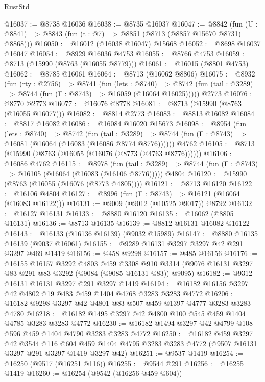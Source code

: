 \begin{lexlean}{RustStd}
\begin{coremodule}
@16037 := @8738 @16036
@16038 := @8735 @16037
@16047 := @8842
    (fun (U : @8841) => @8843 (fun (t : @7) => @8851 (@8713 (@8857 @15670 @8731) @8868)))
@16050 := @16012 (@16038 @16047) @15668
@16052 := @8698 @16037 @16047
@16054 := @8929 @16036 @4753
@16055 := @8766 @4753
@16059 := @8713 (@15990 (@8763 (@16055 @8779)))
@16061 := @16015 (@8801 @4753)
@16062 := @8785 @16061
@16064 := @8713 (@16062 @8806)
@16075 := @8932
    (fun (rty : @2756) =>
    @8741
      (fun (lets : @8740) =>
      @8742 (fun (tail : @3289) => @8744 (fun (Γ : @8743) => @16059 (@16064 @16025)))))
    @2773
@16076 := @8770 @2773
@16077 := @16076 @8778
@16081 := @8713 (@15990 (@8763 (@16055 @16077)))
@16082 := @8814 @2773
@16083 := @8813 @16082
@16084 := @8817 @16082
@16086 := @16084 @16020 @15673
@16098 := @8954
    (fun (lets : @8740) =>
    @8742
      (fun (tail : @3289) =>
      @8744 (fun (Γ : @8743) => @16081 (@16064 (@16083 (@16086 @8774 @8776))))))
    @4762
@16105 := @8713 (@15990 (@8763 (@16055 (@16076 (@8773 (@4763 @8776))))))
@16106 := @16086 @4762
@16115 := @8978
    (fun (tail : @3289) => @8744 (fun (Γ : @8743) => @16105 (@16064 (@16083 (@16106 @8776)))))
    @4804
@16120 := @15990 (@8763 (@16055 (@16076 (@8773 @4805))))
@16121 := @8713 @16120
@16122 := @16106 @4804
@16127 := @8996 (fun (Γ : @8743) => @16121 (@16064 (@16083 @16122)))
@16131 := @9009 (@9012 (@10525 @9017)) @8792
@16132 := @16127 @16131
@16133 := @8880 @16120
@16135 := @16062 (@8805 @16131)
@16136 := @8713 @16135
@16139 := @8812 @16131 @16082 @16122
@16143 := @16133 (@16136 @16139) (@9032 @15989)
@16147 := @8880 @16135 @16139 (@9037 @16061)
@16155 := @9289 @16131 @3297 @3297 @42 @291 @3297 @469 @1419
@16156 := @458 @9298
@16157 := @485 @16156
@16176 := @16155
    @16157
    @3292
    @4803
    @459
    @3308
    @910
    @3314
    (@9076 @16131 @3297 @83 @291 @83 @3292 (@9084 (@9085 @16131 @83)) @9095)
@16182 := @9312 @16131 @16131 @3297 @291 @3297 @1419
@16194 := @16182 @16156 @3297 @42 @4802 @19 @483 @459 @1404 @4768 @3283 @3283 @4772
@16206 := @16182 @9298 @3297 @42 @4801 @83 @507 @459 @1397 @4777 @3283 @3283 @4780
@16218 := @16182 @1495 @3297 @42 @4800 @100 @545 @459 @1404 @4785 @3283 @3283 @4772
@16230 := @16182 @1494 @3297 @42 @4799 @108 @596 @459 @1404 @4790 @3283 @3283 @4772
@16250 := @16182
    @459
    @3297
    @42
    @3544
    @116
    @604
    @459
    @1404
    @4795
    @3283
    @3283
    @4772
    (@9507 @16131 @3297 @291 @3297 @1419 @3297 @42)
@16251 := @9537 @1419
@16254 := @16250 (@9517 (@16251 @116))
@16255 := @9544 @291
@16256 := @16255 @1419
@16260 := @16254 (@9542 (@16256 @459 @604))

\end{coremodule}
\end{lexlean}
